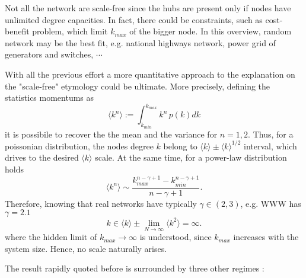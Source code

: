 \documentclass[a4paper,10pt,twoside]{book} %
\theoremstyle{definition}
\begin{document}
Not all the network are scale-free since the hubs are present only if nodes have unlimited degree capacities.
In fact, there could be constraints, such as cost-benefit problem, which limit $k_{max}$ of the bigger node. In this overview, random network may be the best fit, e.g. national highways network, power grid of generators and switches, $\cdots$

With all the previous effort a more quantitative approach to the explanation on the "scale-free" etymology could be ultimate.
More precisely, defining the statistics momentums as
\begin{equation}
	\langle k^n \rangle := \int_{k_{min}}^{k_{max}} k^n\, p(k) dk
\end{equation}
it is possibile to recover the the mean and the variance for $n = 1,2$.
Thus, for a poissonian distribution, the nodes degree $k$ belong to $\langle k \rangle \pm  \langle k \rangle ^ {1/2}$ interval, which drives to the desired $\langle k \rangle$ scale. At the same time, for a power-law distribution holds	
\begin{equation}
	\langle k^n \rangle \sim \frac{k_{max}^{n-\gamma+1}-k_{min}^{n-\gamma+1}}{n-\gamma+1}
	.
\end{equation}
Therefore, knowing that real networks have typically $\gamma \in (2,3)$, e.g. WWW has $\gamma =  2.1$ \cite{barabasi::2016networkbook}
\begin{equation}
	k \in \langle k \rangle \pm \lim_{N \to \infty} \langle k^2 \rangle = \infty.
\end{equation}
where the hidden limit of \( k_{max} \to \infty \) is understood, since $k_{max}$ increases with the system size. 
Hence, no scale naturally arises.

The result rapidly quoted before is surrounded by three other regimes 
\cite{Cohen:2003_SFUSW}:
\end{document}
